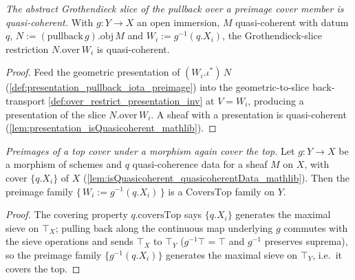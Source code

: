 \begin{lemma}
  \label{lem:isQuasicoherent_over_preimage}
  \textit{The abstract Grothendieck slice of the pullback over a preimage cover member is
  quasi-coherent.}
  With \(g : Y \to X\) an open immersion, \(M\) quasi-coherent with datum \(q\),
  \(N := (\mathrm{pullback}\,g).\mathrm{obj}\,M\) and \(W_i := g^{-1}(q.X_i)\), the Grothendieck-slice
  restriction \(N.\mathrm{over}\,W_i\) is quasi-coherent.
\end{lemma}
\begin{proof}
  Feed the geometric presentation of \((W_i.\iota^{*})\,N\)
  (\cref{def:presentation_pullback_iota_preimage}) into the geometric-to-slice back-transport
  \cref{def:over_restrict_presentation_inv} at \(V = W_i\), producing a presentation of the slice
  \(N.\mathrm{over}\,W_i\). A sheaf with a presentation is quasi-coherent
  (\cref{lem:presentation_isQuasicoherent_mathlib}).
\end{proof}

\begin{lemma}
  \label{lem:coversTop_preimage}
  \textit{Preimages of a top cover under a morphism again cover the top.}
  Let \(g : Y \to X\) be a morphism of schemes and \(q\) quasi-coherence data for a sheaf \(M\) on
  \(X\), with cover \(\{q.X_i\}\) of \(X\) (\cref{lem:isQuasicoherent_quasicoherentData_mathlib}). Then
  the preimage family \(\{\,W_i := g^{-1}(q.X_i)\,\}\) is a \(\mathrm{CoversTop}\) family on \(Y\).
\end{lemma}
\begin{proof}
  The covering property \(q.\mathrm{coversTop}\) says \(\{q.X_i\}\) generates the maximal sieve on
  \(\top_X\); pulling back along the continuous map underlying \(g\) commutes with the sieve operations
  and sends \(\top_X\) to \(\top_Y\) (\(g^{-1}\top = \top\) and \(g^{-1}\) preserves suprema), so the
  preimage family \(\{g^{-1}(q.X_i)\}\) generates the maximal sieve on \(\top_Y\), i.e.\ it covers the
  top.
\end{proof}


